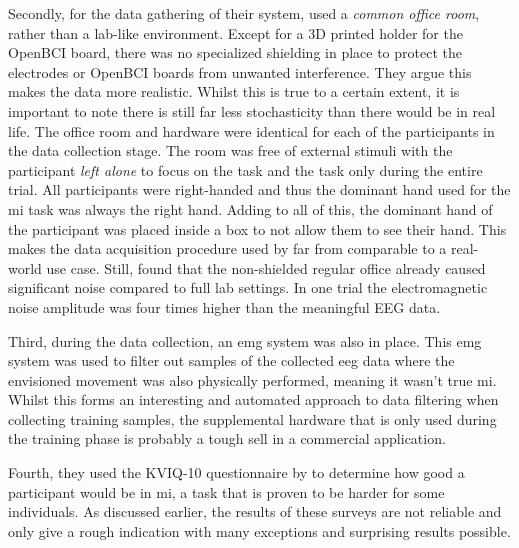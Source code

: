Secondly, for the data gathering of their system, \citet{cheap_bci_feasibility} used a \textit{common office room}, rather than a lab-like environment.
Except for a 3D printed holder for the OpenBCI board, there was no specialized shielding in place to protect the electrodes or OpenBCI boards from unwanted interference.
They argue this makes the data more realistic.
Whilst this is true to a certain extent, it is important to note there is still far less stochasticity than there would be in real life.
The office room and hardware were identical for each of the participants in the data collection stage.
The room was free of external stimuli with the participant \textit{left alone} to focus on the task and the task only during the entire trial.
All participants were right-handed and thus the dominant hand used for the \gls{mi} task was always the right hand.
Adding to all of this, the dominant hand of the participant was placed inside a box to not allow them to see their hand.
This makes the data acquisition procedure used by \citet{cheap_bci_feasibility} far from comparable to a real-world use case.
Still, \citet{cheap_bci_feasibility} found that the non-shielded regular office already caused significant noise compared to full lab settings.
In one trial the electromagnetic noise amplitude was four times higher than the meaningful EEG data.

Third, during the data collection, an \gls{emg} system was also in place.
This \gls{emg} system was used to filter out samples of the collected \gls{eeg} data where the envisioned movement was also physically performed, meaning it wasn't true \gls{mi}.
Whilst this forms an interesting and automated approach to data filtering when collecting training samples, the supplemental hardware that is only used during the training phase is probably a tough sell in a commercial application.

Fourth, they used the KVIQ-10 questionnaire by \citet{kviq} to determine how good a participant would be in \gls{mi}, a task that is proven to be harder for some individuals.
As discussed earlier, the results of these surveys are not reliable and only give a rough indication with many exceptions and surprising results possible.

